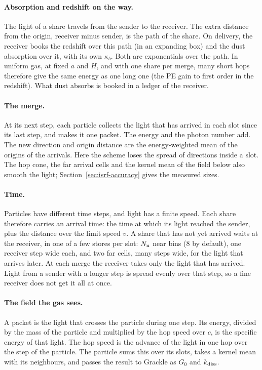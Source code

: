 \paragraph{Absorption and redshift on the way.} The light of a share travels
from the sender to the receiver. The extra distance from the origin, receiver
minus sender, is the path of the share. On delivery, the receiver books the
redshift over this path (in an expanding box) and the dust absorption over it,
with its own $\kappa_b$. Both are exponentials over the path. In uniform gas,
at fixed $a$ and $H$, and with one share per merge, many short hops therefore
give the same energy as one long one (the PE gain to first order in the
redshift). What dust absorbs is booked in a ledger of the receiver.

\paragraph{The merge.} At its next step, each particle collects the light that
has arrived in each slot since its last step, and makes it one packet. The
energy and the photon number add. The new direction and origin distance are
the energy-weighted mean of the origins of the arrivals. Here the scheme loses
the spread of directions inside a slot. The hop cone, the far arrival cells
and the kernel mean of the field below also smooth the light;
Section~\ref{sec:isrf-accuracy} gives the measured sizes.

\paragraph{Time.} Particles have different time steps, and light has a finite
speed. Each share therefore carries an arrival time: the time at which its
light reached the sender, plus the distance over the limit speed $v$. A share
that has not yet arrived waits at the receiver, in one of a few stores per
slot: $N_{\rm n}$ near bins (8 by default), one receiver step wide each, and
two far cells, many steps wide, for the light that arrives later. At each merge the receiver takes
only the light that has arrived. Light from a sender with a longer step is
spread evenly over that step, so a fine receiver does not get it all at once.

\paragraph{The field the gas sees.} A packet is the light that crosses the
particle during one step. Its energy, divided by the mass of the particle and
multiplied by the hop speed over $c$, is the specific energy of that light.
The hop speed is the advance of the light in one hop over the step of the
particle.
The particle sums this over its slots, takes a kernel mean with its
neighbours, and passes the result to Grackle as $G_0$ and $k_{\rm diss}$.


